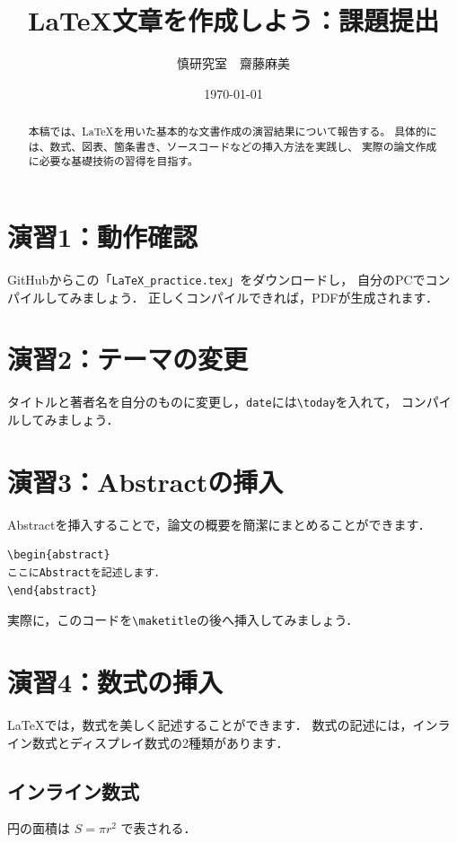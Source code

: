 \documentclass[a4paper,twocolumn]{jsarticle}
\title{LaTeX文章を作成しよう：課題提出}
\author{慎研究室　齋藤麻美}
\date{\today}
\begin{document}
\maketitle

\begin{abstract}
本稿では、LaTeXを用いた基本的な文書作成の演習結果について報告する。
具体的には、数式、図表、箇条書き、ソースコードなどの挿入方法を実践し、
実際の論文作成に必要な基礎技術の習得を目指す。
\end{abstract}

\section*{演習1：動作確認}
GitHubからこの「\texttt{LaTeX\_practice.tex}」をダウンロードし，
自分のPCでコンパイルしてみましょう．
正しくコンパイルできれば，PDFが生成されます．

\section*{演習2：テーマの変更}
タイトルと著者名を自分のものに変更し，\texttt{date}には\verb|\today|を入れて，
コンパイルしてみましょう．

\section*{演習3：Abstractの挿入}
Abstractを挿入することで，論文の概要を簡潔にまとめることができます．

\begin{verbatim}
\begin{abstract}
ここにAbstractを記述します．
\end{abstract}
\end{verbatim}

実際に，このコードを\verb|\maketitle|の後へ挿入してみましょう．

\section*{演習4：数式の挿入}
LaTeXでは，数式を美しく記述することができます．
数式の記述には，インライン数式とディスプレイ数式の2種類があります．

\subsection*{インライン数式}
円の面積は $S=\pi r^2$ で表される．
\end{document}
